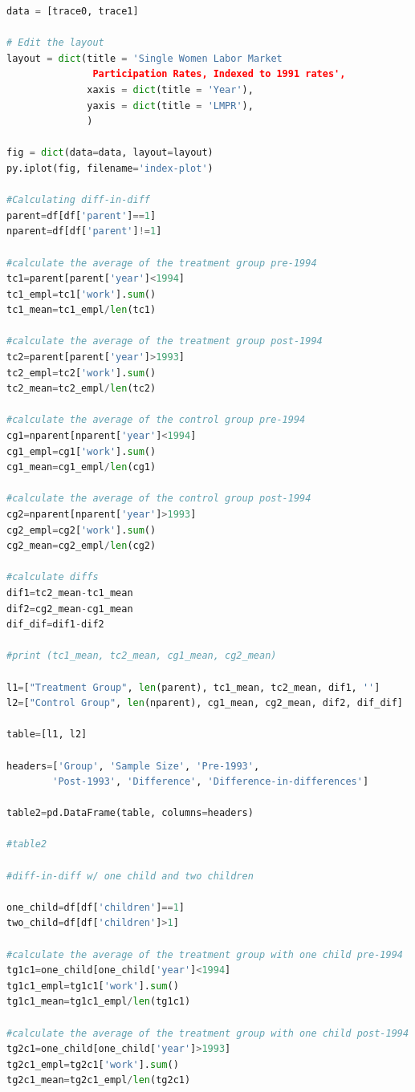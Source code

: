 \documentclass{article}
\begin{document}
\begin{lstlisting}[language=Python]
data = [trace0, trace1]

# Edit the layout
layout = dict(title = 'Single Women Labor Market 
			   Participation Rates, Indexed to 1991 rates',
              xaxis = dict(title = 'Year'),
              yaxis = dict(title = 'LMPR'),
              )

fig = dict(data=data, layout=layout)
py.iplot(fig, filename='index-plot')

#Calculating diff-in-diff
parent=df[df['parent']==1]
nparent=df[df['parent']!=1]

#calculate the average of the treatment group pre-1994
tc1=parent[parent['year']<1994]
tc1_empl=tc1['work'].sum()
tc1_mean=tc1_empl/len(tc1)

#calculate the average of the treatment group post-1994
tc2=parent[parent['year']>1993]
tc2_empl=tc2['work'].sum()
tc2_mean=tc2_empl/len(tc2)

#calculate the average of the control group pre-1994
cg1=nparent[nparent['year']<1994]
cg1_empl=cg1['work'].sum()
cg1_mean=cg1_empl/len(cg1)

#calculate the average of the control group post-1994
cg2=nparent[nparent['year']>1993]
cg2_empl=cg2['work'].sum()
cg2_mean=cg2_empl/len(cg2)

#calculate diffs
dif1=tc2_mean-tc1_mean
dif2=cg2_mean-cg1_mean
dif_dif=dif1-dif2

#print (tc1_mean, tc2_mean, cg1_mean, cg2_mean)

l1=["Treatment Group", len(parent), tc1_mean, tc2_mean, dif1, '']
l2=["Control Group", len(nparent), cg1_mean, cg2_mean, dif2, dif_dif]

table=[l1, l2]

headers=['Group', 'Sample Size', 'Pre-1993', 
		'Post-1993', 'Difference', 'Difference-in-differences']

table2=pd.DataFrame(table, columns=headers)

#table2

#diff-in-diff w/ one child and two children

one_child=df[df['children']==1]
two_child=df[df['children']>1]

#calculate the average of the treatment group with one child pre-1994
tg1c1=one_child[one_child['year']<1994]
tg1c1_empl=tg1c1['work'].sum()
tg1c1_mean=tg1c1_empl/len(tg1c1)

#calculate the average of the treatment group with one child post-1994
tg2c1=one_child[one_child['year']>1993]
tg2c1_empl=tg2c1['work'].sum()
tg2c1_mean=tg2c1_empl/len(tg2c1)


\end{lstlisting}
\end{document}

